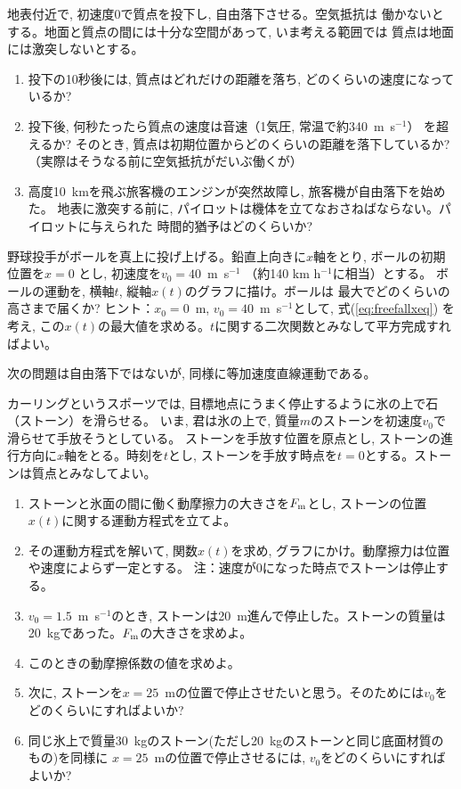 \begin{q}\label{q:freefall1}
地表付近で, 初速度0で質点を投下し, 自由落下させる。空気抵抗は
働かないとする。地面と質点の間には十分な空間があって, いま考える範囲では
質点は地面には激突しないとする。
\begin{enumerate}
\item 投下の10秒後には, 質点はどれだけの距離を落ち, どのくらいの速度になっているか? 
\item 投下後, 何秒たったら質点の速度は音速（1気圧, 常温で約340~m~s$^{-1}$）
を超えるか? そのとき, 質点は初期位置からどのくらいの距離を落下しているか? 
（実際はそうなる前に空気抵抗がだいぶ働くが）
\item 高度10~kmを飛ぶ旅客機のエンジンが突然故障し, 旅客機が自由落下を始めた。
地表に激突する前に, パイロットは機体を立てなおさねばならない。パイロットに与えられた
時間的猶予はどのくらいか?
\end{enumerate}
\end{q}
\mv

\begin{q}\label{q:baseball0}
野球投手がボールを真上に投げ上げる。鉛直上向きに$x$軸をとり, ボールの初期位置を$x=0$
とし, 初速度を$v_0=40$~m~s$^{-1}$ （約140 km h$^{-1}$に相当）とする。
ボールの運動を, 横軸$t$, 縦軸$x(t)$のグラフに描け。ボールは
最大でどのくらいの高さまで届くか?
ヒント：$x_0=0$~m, $v_0=40$~m~s$^{-1}$として, 式(\ref{eq:freefallxeq})
を考え, この$x(t)$の最大値を求める。$t$に関する二次関数とみなして平方完成すればよい。
\end{q}
\mv

次の問題は自由落下ではないが, 同様に等加速度直線運動である。

\begin{q}\label{q:curling}
カーリングというスポーツでは, 
目標地点にうまく停止するように氷の上で石（ストーン）を滑らせる。
いま, 君は氷の上で, 質量$m$のストーンを初速度$v_0$で滑らせて手放そうとしている。
ストーンを手放す位置を原点とし, ストーンの進行方向に$x$軸をとる。時刻を$t$とし, 
ストーンを手放す時点を$t=0$とする。ストーンは質点とみなしてよい。
\begin{enumerate}
\item ストーンと氷面の間に働く動摩擦力の大きさを$F_{\text m}$とし, ストーンの位置$x(t)$に関する運動方程式を立てよ。
\item その運動方程式を解いて, 関数$x(t)$を求め, グラフにかけ。動摩擦力は位置や速度によらず一定とする。
注：速度が0になった時点でストーンは停止する。
\item $v_0=1.5$~m~s$^{-1}$のとき, ストーンは20~m進んで停止した。ストーンの質量は20~kgであった。$F_{\text m}$の大きさを求めよ。
\item このときの動摩擦係数の値を求めよ。
\item 次に, ストーンを$x=25$~mの位置で停止させたいと思う。そのためには$v_0$をどのくらいにすればよいか?
\item 同じ氷上で質量30~kgのストーン(ただし20~kgのストーンと同じ底面材質のもの)を同様に
$x=25$~mの位置で停止させるには, $v_0$をどのくらいにすればよいか?
\end{enumerate}
\end{q}
\mv

